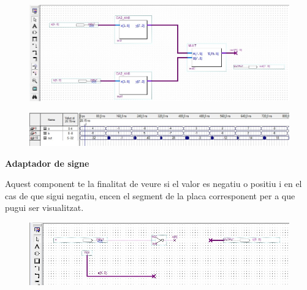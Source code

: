 \documentclass[12pt, a4papre]{article}
\begin{document}
	
	\begin{center}
	\begin{figure}[H]
		\begin{center}
		\includegraphics[width=150mm]{multCA2_4B.jpeg}
		\end{center}
	\end{figure}
	
	\end{center}
	\begin{center}
	\begin{figure}[H]
		\begin{center}
		\includegraphics[width=150mm]{multCA2_4Bsimul.jpeg}
		\end{center}
	\end{figure}
	
	\end{center}
	
	
	\textbf{\large{Adaptador de signe}}
	
	Aquest component te la finalitat de veure si el valor es negatiu o positiu i en el cas de que sigui negatiu, encen el segment de la placa corresponent per a que pugui ser visualitzat.
	
	\begin{center}
	\begin{figure}[H]
		\begin{center}
		\includegraphics[width=150mm]{adaptSigne.jpeg}
		\end{center}
	\end{figure}
	
	\end{center}
	
\end{document}
